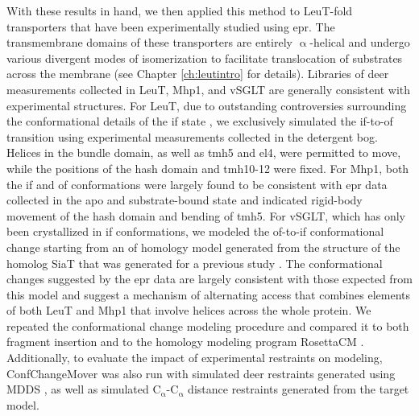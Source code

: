 With these results in hand, we then applied this method to LeuT-fold transporters that have been experimentally studied using \gls{epr}. The transmembrane domains of these transporters are entirely $\mathrm{\upalpha}$-helical and undergo various divergent modes of isomerization to facilitate translocation of substrates across the membrane (see Chapter \ref{ch:leutintro} for details). Libraries of \gls{deer} measurements collected in LeuT, Mhp1, and vSGLT are generally consistent with experimental structures. For LeuT, due to outstanding controversies surrounding the conformational details of the \gls{if} state \citep*{Kazmier2014a, Sohail2016}, we exclusively simulated the \gls{if}-to-\gls{of} transition using experimental measurements collected in the detergent \gls{bog}. Helices in the bundle domain, as well as \gls{tmh}5 and \gls{el}4, were permitted to move, while the positions of the hash domain and \gls{tmh}10-12 were fixed. For Mhp1, both the \gls{if} and \gls{of} conformations were largely found to be consistent with \gls{epr} data collected in the apo and substrate-bound state and indicated rigid-body movement of the hash domain and bending of \gls{tmh}5. For vSGLT, which has only been crystallized in \gls{if} conformations, we modeled the \gls{of}-to-\gls{if} conformational change starting from an \gls{of} homology model generated from the structure of the homolog SiaT \citep*{Wahlgren2018} that was generated for a previous study \citep*{Paz2018}. The conformational changes suggested by the \gls{epr} data are largely consistent with those expected from this model and suggest a mechanism of alternating access that combines elements of both LeuT and Mhp1 that involve helices across the whole protein. We repeated the conformational change modeling procedure and compared it to both fragment insertion and to the homology modeling program RosettaCM \citep*{Song2013}. Additionally, to evaluate the impact of experimental restraints on modeling, ConfChangeMover was also run with simulated \gls{deer} restraints generated using MDDS \citep*{Islam2013}, as well as simulated $\mathrm{C_{\upalpha}}$-$\mathrm{C_{\upalpha}}$ distance restraints generated from the target model.


